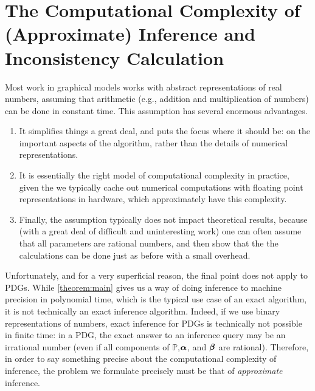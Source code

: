 \section{The Computational Complexity of (Approximate) Inference and Inconsistency Calculation}
    \label{sec:approximate-inference}

\def\ApproxPDGInfer{\textsf{APPROX-PDG-INFER}}
\def\ApproxPDGInc{\textsf{APPROX-CALC-INC}}
\def\ApproxInferUniq{\textsf{APPROX-INFER-CVX}}

Most work in graphical models works with abstract representations of real numbers, assuming that arithmetic (e.g., addition and multiplication of numbers) can be done in constant time. 
This assumption has several enormous advantages. 
\begin{enumerate}
\item 
It simplifies things a great deal, and puts the focus where it should be: on the important aspects of the algorithm, rather than the details of numerical representations.
\item 
It is essentially the right model of computational complexity in practice, given the we typically cache out numerical computations with floating point representations in hardware, which approximately have this complexity.
\item 
Finally, the assumption typically does not impact theoretical results, because (with a great deal of difficult and uninteresting work) one can often assume that all parameters are rational numbers, and then show that the the calculations can be done just as before with a small overhead.
\end{enumerate}

Unfortunately, and for a very superficial reason, the final point does not apply to PDGs.
While \cref{theorem:main} gives us a way of doing inference to machine precision in polynomial time, which is the typical use case of an exact algorithm, it is not technically an exact inference algorithm.
Indeed, if we use binary representations of numbers, exact inference for PDGs is technically not possible in finite time: in a PDG, the exact answer to an inference query may be an irrational number (even if all components of $\mathbb P$,$\boldsymbol\alpha$, and $\boldsymbol\beta$ are rational).
Therefore, in order to say something precise about the computational complexity of inference, the problem we formulate precisely must be that of \emph{approximate} inference. 

